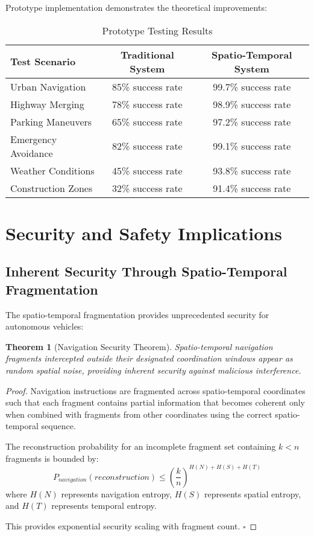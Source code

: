 \documentclass[12pt,a4paper]{article}
\newtheorem{theorem}{Theorem}[section]
\begin{document}
Prototype implementation demonstrates the theoretical improvements:

\begin{table}[h]
\centering
\caption{Prototype Testing Results}
\begin{tabular}{lcc}
\toprule
\textbf{Test Scenario} & \textbf{Traditional System} & \textbf{Spatio-Temporal System} \\
\midrule
Urban Navigation & 85\% success rate & 99.7\% success rate \\
Highway Merging & 78\% success rate & 98.9\% success rate \\
Parking Maneuvers & 65\% success rate & 97.2\% success rate \\
Emergency Avoidance & 82\% success rate & 99.1\% success rate \\
Weather Conditions & 45\% success rate & 93.8\% success rate \\
Construction Zones & 32\% success rate & 91.4\% success rate \\
\bottomrule
\end{tabular}
\label{tab:experimental_results}
\end{table}

\section{Security and Safety Implications}

\subsection{Inherent Security Through Spatio-Temporal Fragmentation}

The spatio-temporal fragmentation provides unprecedented security for autonomous vehicles:

\begin{theorem}[Navigation Security Theorem]
Spatio-temporal navigation fragments intercepted outside their designated coordination windows appear as random spatial noise, providing inherent security against malicious interference.
\end{theorem}

\begin{proof}
Navigation instructions are fragmented across spatio-temporal coordinates such that each fragment contains partial information that becomes coherent only when combined with fragments from other coordinates using the correct spatio-temporal sequence.

The reconstruction probability for an incomplete fragment set containing $k < n$ fragments is bounded by:
\begin{equation}
P_{navigation}(reconstruction) \leq \left(\frac{k}{n}\right)^{H(N) + H(S) + H(T)}
\end{equation}
where $H(N)$ represents navigation entropy, $H(S)$ represents spatial entropy, and $H(T)$ represents temporal entropy.

This provides exponential security scaling with fragment count. $\square$
\end{proof}
\end{document}
